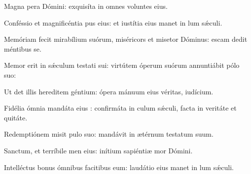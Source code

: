 \item {}

\item Magna pera Dómini:\psstar{} exquisíta in omnes voluntes eius.

\item Conféssio et magnificéntia pus eius:\psstar{} et iustítia eius manet in lum sǽculi.

\item Memóriam fecit mirabílium suórum,\pscross{} miséricors et misetor Dóminus:\psstar{} escam dedit méntibus se.

\item Memor erit in sǽculum testati sui:\psstar{} virtútem óperum suórum annuntiábit pólo suo:

\item Ut det illis hereditem géntium:\psstar{} ópera mánuum eius véritas,  iudícium.

\item Fidélia ómnia mandáta eius :\pscross{} confirmáta in culum sǽculi,\psstar{} facta in veritáte et quitáte.

\item Redemptiónem misit pulo suo:\psstar{} mandávit in ætérnum testatum suum.

\item Sanctum, et terríbile men eius:\psstar{} inítium sapiéntiæ mor Dómini.

\item Intelléctus bonus ómnibus facitibus eum:\psstar{} laudátio eius manet in lum sǽculi.